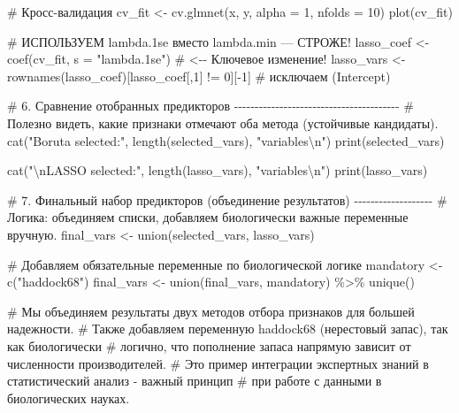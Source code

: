 \documentclass[
  letterpaper,
  DIV=11,
  numbers=noendperiod]{scrreprt}
\newenvironment{Shaded}{\begin{snugshade}}{\end{snugshade}}
\newcommand{\AttributeTok}[1]{\textcolor[rgb]{0.40,0.45,0.13}{#1}}
\newcommand{\CommentTok}[1]{\textcolor[rgb]{0.37,0.37,0.37}{#1}}
\newcommand{\DecValTok}[1]{\textcolor[rgb]{0.68,0.00,0.00}{#1}}
\newcommand{\FunctionTok}[1]{\textcolor[rgb]{0.28,0.35,0.67}{#1}}
\newcommand{\NormalTok}[1]{\textcolor[rgb]{0.00,0.23,0.31}{#1}}
\newcommand{\OtherTok}[1]{\textcolor[rgb]{0.00,0.23,0.31}{#1}}
\newcommand{\SpecialCharTok}[1]{\textcolor[rgb]{0.37,0.37,0.37}{#1}}
\newcommand{\StringTok}[1]{\textcolor[rgb]{0.13,0.47,0.30}{#1}}
\begin{document}
\begin{Shaded}
\begin{Highlighting}[]
\CommentTok{\# Кросс{-}валидация}
\NormalTok{cv\_fit }\OtherTok{\textless{}{-}} \FunctionTok{cv.glmnet}\NormalTok{(x, y, }\AttributeTok{alpha =} \DecValTok{1}\NormalTok{, }\AttributeTok{nfolds =} \DecValTok{10}\NormalTok{)}
\FunctionTok{plot}\NormalTok{(cv\_fit)}

\CommentTok{\# ИСПОЛЬЗУЕМ lambda.1se вместо lambda.min — СТРОЖЕ!}
\NormalTok{lasso\_coef }\OtherTok{\textless{}{-}} \FunctionTok{coef}\NormalTok{(cv\_fit, }\AttributeTok{s =} \StringTok{"lambda.1se"}\NormalTok{)  }\CommentTok{\# \textless{}{-}{-} Ключевое изменение!}
\NormalTok{lasso\_vars }\OtherTok{\textless{}{-}} \FunctionTok{rownames}\NormalTok{(lasso\_coef)[lasso\_coef[,}\DecValTok{1}\NormalTok{] }\SpecialCharTok{!=} \DecValTok{0}\NormalTok{][}\SpecialCharTok{{-}}\DecValTok{1}\NormalTok{]  }\CommentTok{\# исключаем (Intercept)}


\CommentTok{\# 6. Сравнение отобранных предикторов {-}{-}{-}{-}{-}{-}{-}{-}{-}{-}{-}{-}{-}{-}{-}{-}{-}{-}{-}{-}{-}{-}{-}{-}{-}{-}{-}{-}{-}{-}{-}{-}{-}{-}{-}{-}{-}{-}{-}{-}}
\CommentTok{\# Полезно видеть, какие признаки отмечают оба метода (устойчивые кандидаты).}
\FunctionTok{cat}\NormalTok{(}\StringTok{"Boruta selected:"}\NormalTok{, }\FunctionTok{length}\NormalTok{(selected\_vars), }\StringTok{"variables}\SpecialCharTok{\textbackslash{}n}\StringTok{"}\NormalTok{)}
\FunctionTok{print}\NormalTok{(selected\_vars)}

\FunctionTok{cat}\NormalTok{(}\StringTok{"}\SpecialCharTok{\textbackslash{}n}\StringTok{LASSO selected:"}\NormalTok{, }\FunctionTok{length}\NormalTok{(lasso\_vars), }\StringTok{"variables}\SpecialCharTok{\textbackslash{}n}\StringTok{"}\NormalTok{)}
\FunctionTok{print}\NormalTok{(lasso\_vars)}

\CommentTok{\# 7. Финальный набор предикторов (объединение результатов) {-}{-}{-}{-}{-}{-}{-}{-}{-}{-}{-}{-}{-}{-}{-}{-}{-}{-}{-}}
\CommentTok{\# Логика: объединяем списки, добавляем биологически важные переменные вручную.}
\NormalTok{final\_vars }\OtherTok{\textless{}{-}} \FunctionTok{union}\NormalTok{(selected\_vars, lasso\_vars) }

\CommentTok{\# Добавляем обязательные переменные по биологической логике}
\NormalTok{mandatory }\OtherTok{\textless{}{-}} \FunctionTok{c}\NormalTok{(}\StringTok{"haddock68"}\NormalTok{)}
\NormalTok{final\_vars }\OtherTok{\textless{}{-}} \FunctionTok{union}\NormalTok{(final\_vars, mandatory) }\SpecialCharTok{\%\textgreater{}\%} \FunctionTok{unique}\NormalTok{()}

\CommentTok{\# Мы объединяем результаты двух методов отбора признаков для большей надежности.}
\CommentTok{\# Также добавляем переменную haddock68 (нерестовый запас), так как биологически }
\CommentTok{\# логично, что пополнение запаса напрямую зависит от численности производителей. }
\CommentTok{\# Это пример интеграции экспертных знаний в статистический анализ {-} важный принцип }
\CommentTok{\# при работе с данными в биологических науках.}


\end{Highlighting}
\end{Shaded}
\end{document}
